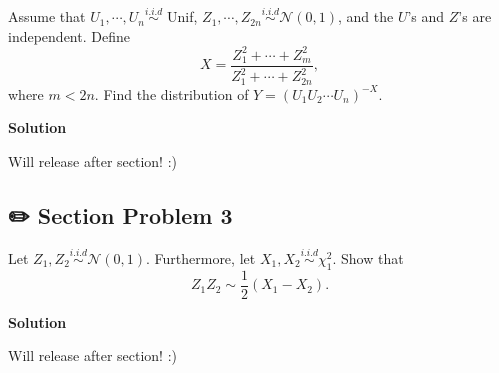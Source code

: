 \documentclass[
  letterpaper,
  DIV=11,
  numbers=noendperiod]{scrreprt}
\theoremstyle{definition}
\theoremstyle{plain}
\theoremstyle{remark}
\begin{document}
Assume that \(U_1, \cdots, U_n \overset{i.i.d}{\sim}\) Unif,
\(Z_1, \cdots, Z_{2n} \overset{i.i.d}{\sim} \mathcal{N}(0,1)\), and the
\(U\)'s and \(Z\)'s are independent. Define \[
X = \frac{Z_1^2 + \cdots + Z_m^2}{ Z_1^2 + \cdots + Z_{2n}^2},
\] where \(m< 2n\). Find the distribution of
\(Y = (U_1 U_2 \cdots U_n)^{-X}\).

\begin{tcolorbox}[enhanced jigsaw, leftrule=.75mm, colframe=quarto-callout-tip-color-frame, colback=white, breakable, opacityback=0, left=2mm, bottomrule=.15mm, arc=.35mm, rightrule=.15mm, toprule=.15mm]
\begin{minipage}[t]{5.5mm}
\textcolor{quarto-callout-tip-color}{\faLightbulb}
\end{minipage}%
\begin{minipage}[t]{\textwidth - 5.5mm}

\textbf{Solution}\vspace{2mm}

Will release after section! :)

\end{minipage}%
\end{tcolorbox}

\hypertarget{section-problem-3-1}{%
\subsection*{✏️ Section Problem 3}\label{section-problem-3-1}}

Let \(Z_1, Z_2 \overset{i.i.d}{\sim} \mathcal{N}(0,1)\). Furthermore,
let \(X_1,X_2 \overset{i.i.d}{\sim} \chi_1^2\). Show that \[
Z_1Z_2\sim \frac{1}{2} (X_1 - X_2).
\]

\begin{tcolorbox}[enhanced jigsaw, leftrule=.75mm, colframe=quarto-callout-tip-color-frame, colback=white, breakable, opacityback=0, left=2mm, bottomrule=.15mm, arc=.35mm, rightrule=.15mm, toprule=.15mm]
\begin{minipage}[t]{5.5mm}
\textcolor{quarto-callout-tip-color}{\faLightbulb}
\end{minipage}%
\begin{minipage}[t]{\textwidth - 5.5mm}

\textbf{Solution}\vspace{2mm}

Will release after section! :)

\end{minipage}%
\end{tcolorbox}
\end{document}
